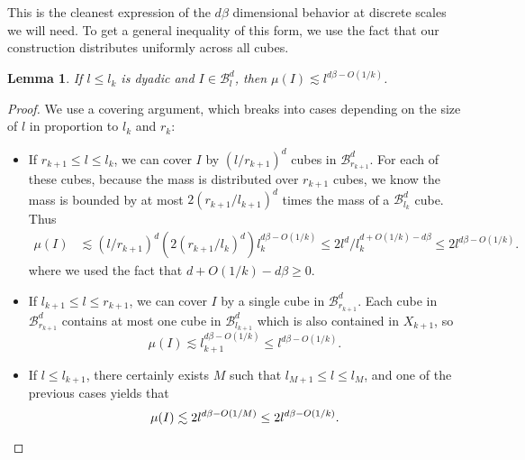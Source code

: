 \documentclass[usenames,dvipsnames]{article}
\theoremstyle{plain}
\newtheorem{lemma}{Lemma}
\newtheorem{corollary}{Corollary}
\theoremstyle{plain}
\begin{document}

This is the cleanest expression of the $d \beta$ dimensional behavior at discrete scales we will need. To get a general inequality of this form, we use the fact that our construction distributes uniformly across all cubes.

\begin{lemma}
	If $l \leq l_k$ is dyadic and $I \in \mathcal{B}^d_l$, then $\mu(I) \lesssim l^{d\beta - O(1/k)}$.
\end{lemma}
\begin{proof}
	We use a covering argument, which breaks into cases depending on the size of $l$ in proportion to $l_k$ and $r_k$:
	\begin{itemize}
		\item If $r_{k+1} \leq l \leq l_k$, we can cover $I$ by $(l/r_{k+1})^d$ cubes in $\mathcal{B}^d_{r_{k+1}}$. For each of these cubes, because the mass is distributed over $r_{k+1}$ cubes, we know the mass is bounded by at most $2(r_{k+1}/l_{k+1})^d$ times the mass of a $\mathcal{B}^d_{l_k}$ cube. Thus
		\begin{align*}
			\mu(I) &\lesssim (l/r_{k+1})^d (2(r_{k+1}/l_k)^d) l_k^{d \beta - O(1/k)} \leq 2 l^d / l_k^{d + O(1/k) - d \beta} \leq 2 l^{d \beta - O(1/k)}.
		\end{align*}
		where we used the fact that $d + O(1/k) - d\beta \geq 0$.

		\item If $l_{k+1} \leq l \leq r_{k+1}$, we can cover $I$ by a single cube in $\mathcal{B}^d_{r_{k+1}}$. Each cube in $\mathcal{B}^d_{r_{k+1}}$ contains at most one cube in $\mathcal{B}^d_{l_{k+1}}$ which is also contained in $X_{k+1}$, so
		\[ \mu(I) \lesssim l_{k+1}^{d\beta - O(1/k)} \leq l^{d \beta - O(1/k)}. \]

		\item If $l \leq l_{k+1}$, there certainly exists $M$ such that $l_{M+1} \leq l \leq l_M$, and one of the previous cases yields that
		\[ \mu(I) \lesssim 2 l^{d \beta - O(1/M)} \leq 2 l^{d \beta - O(1/k)}. \qedhere \]
	\end{itemize}
\end{proof}
\end{document}
